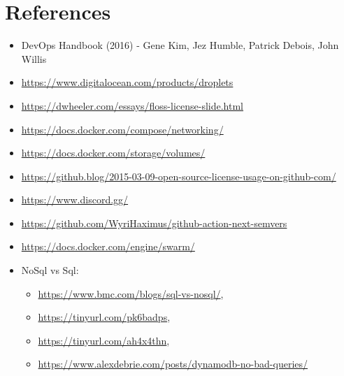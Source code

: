 \section{References}
\begin{itemize}
    \item DevOps Handbook (2016) - Gene Kim, Jez Humble, Patrick Debois, John Willis
    \item \url{https://www.digitalocean.com/products/droplets}
    \item \url{https://dwheeler.com/essays/floss-license-slide.html}
    \item \url{https://docs.docker.com/compose/networking/}
    \item \url{https://docs.docker.com/storage/volumes/}
    \item \url{https://github.blog/2015-03-09-open-source-license-usage-on-github-com/}
    \item \url{https://www.discord.gg/}
    \item \url{https://github.com/WyriHaximus/github-action-next-semvers}
    \item \url{https://docs.docker.com/engine/swarm/}
    \item NoSql vs Sql:
    \begin{itemize}
        \item \url{https://www.bmc.com/blogs/sql-vs-nosql/}, 
        \item \url{https://tinyurl.com/pk6badps}, 
        \item \url{https://tinyurl.com/ah4x4thn}, 
        \item \url{https://www.alexdebrie.com/posts/dynamodb-no-bad-queries/}
    \end{itemize}
\end{itemize}